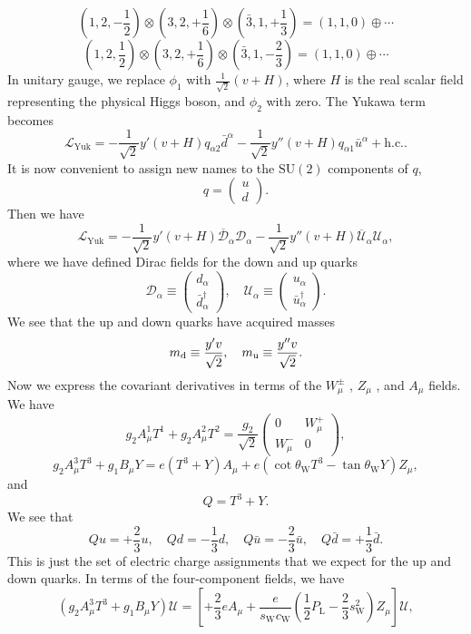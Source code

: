 \[(1,2,-\frac{1}{2}) \otimes (3, 2, +\frac{1}{6}) \otimes (\bar{3}, 1, +\frac{1}{3}) = (1,1,0) \oplus \cdots\]
\[(1,2, \frac{1}{2}) \otimes (3, 2, +\frac{1}{6}) \otimes (\bar{3}, 1, -\frac{2}{3}) = (1,1,0) \oplus \cdots\]
In unitary gauge, we replace $\phi_1$ with $\frac{1}{\sqrt{2}}(v+H)$, where $H$ is the real scalar field representing the physical Higgs boson, and $\phi_2$ with zero. The Yukawa term becomes
\[\mathcal{L}_{\mathrm{Yuk}} = -\frac{1}{\sqrt{2}}y'(v+H)q_{\alpha 2}\bar{d}^{\alpha} - \frac{1}{\sqrt{2}}y''(v+H)q_{\alpha 1}\bar{u}^{\alpha} + \mathrm{h.c.}.\]
It is now convenient to assign new names to the $\mathrm{SU}(2)$ components of $q$,
\[q = \begin{pmatrix}
u \\ d
\end{pmatrix} .\]
Then we have
\[\mathcal{L}_{\mathrm{Yuk}} = -\frac{1}{\sqrt{2}}y'(v+H) \overline{\mathcal{D}}_{\alpha}\mathcal{D}_{\alpha} -\frac{1}{\sqrt{2}}y''(v+H) \overline{\mathcal{U}}_{\alpha}\mathcal{U}_{\alpha},\]
where we have defined Dirac fields for the down and up quarks
\[\mathcal{D}_{\alpha} \equiv \begin{pmatrix}
d_{\alpha} \\ \bar{d}^{\dagger}_{\alpha}
\end{pmatrix} , \quad  \mathcal{U}_{\alpha} \equiv \begin{pmatrix}
u_{\alpha} \\ \bar{u}^{\dagger}_{\alpha}
\end{pmatrix}.\]
We see  that the up and down quarks have acquired masses
\[m_{\rm d} \equiv \frac{y'v}{\sqrt{2}} , \quad m_{\rm u} \equiv \frac{y''v}{\sqrt{2}}.\]
Now we express the covariant derivatives in terms of the $W_{\mu}^{\pm}$ , $Z_{\mu}$ , and $A_{\mu}$ fields. We have
\[g_2 A^1_{\mu}T^1 + g_2 A^2_{\mu}T^2 = \frac{g_2}{\sqrt{2}} \begin{pmatrix}
0 & W_{\mu}^+ \\ W^{-}_{\mu} & 0
\end{pmatrix} ,\]
\[g_2A^3_{\mu}T^3 + g_1 B_{\mu} Y = e(T^3+Y)A_{\mu} + e(\cot\theta_{\mathrm{W}} T^3 - \tan\theta_{\mathrm{W}} Y)Z_{\mu},\]
and
\[Q = T^3 + Y.\]
We see that
\[Qu = +\frac{2}{3}u , \quad Qd = -\frac{1}{3}d , \quad Q\bar{u} = -\frac{2}{3}\bar{u} , \quad Q\bar{d} = +\frac{1}{3}\bar{d}.\]
This is just the set of electric charge assignments that we expect for the up and down quarks. In terms of the four-component fields, we have
\[(g_2A^3_{\mu}T^3 + g_1 B_{\mu} Y) \mathcal{U} = \left[ + \frac{2}{3}eA_{\mu} + \frac{e}{s_{\mathrm{W}} c_{\mathrm{W}}}( \frac{1}{2}P_{\mathrm{L}} -\frac{2}{3}  s_{\mathrm{W}}^2)Z_{\mu} \right] \mathcal{U},\]
